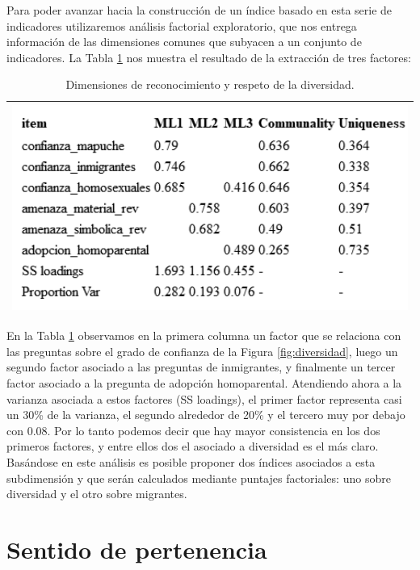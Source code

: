 \documentclass[
  12pt,
]{book}
\begin{document}
Para poder avanzar hacia la construcción de un índice basado en esta serie de indicadores utilizaremos análisis factorial exploratorio, que nos entrega información de las dimensiones comunes que subyacen a un conjunto de indicadores. La Tabla \ref{tab:div-fa} nos muestra el resultado de la extracción de tres factores:

\begin{longtable}[]{@{}l@{}}
\caption{\label{tab:div-fa}Dimensiones de reconocimiento y respeto de la diversidad.}\tabularnewline
\toprule
\endhead
\includegraphics[width=5.20833in,height=\textheight]{output/tables/div_fa.png}\tabularnewline
\bottomrule
\end{longtable}

En la Tabla \ref{tab:div-fa} observamos en la primera columna un factor que se relaciona con las preguntas sobre el grado de confianza de la Figura \ref{fig:diversidad}, luego un segundo factor asociado a las preguntas de inmigrantes, y finalmente un tercer factor asociado a la pregunta de adopción homoparental. Atendiendo ahora a la varianza asociada a estos factores (SS loadings), el primer factor representa casi un 30\% de la varianza, el segundo alrededor de 20\% y el tercero muy por debajo con 0.08. Por lo tanto podemos decir que hay mayor consistencia en los dos primeros factores, y entre ellos dos el asociado a diversidad es el más claro. Basándose en este análisis es posible proponer dos índices asociados a esta subdimensión y que serán calculados mediante puntajes factoriales: uno sobre diversidad y el otro sobre migrantes.

\hypertarget{sentido-de-pertenencia}{%
\section{Sentido de pertenencia}\label{sentido-de-pertenencia}}
\end{document}
